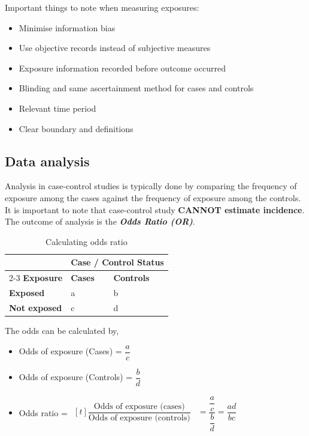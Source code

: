 \documentclass{article}
\begin{document}
Important things to note when measuring exposures:
\begin{itemize}
    \item Minimise information bias
    \item Use objective records instead of subjective measures
    \item Exposure information recorded before outcome occurred
    \item Blinding and same ascertainment method for cases and controls
    \item Relevant time period
    \item Clear boundary and definitions
\end{itemize}

\subsection*{Data analysis}
Analysis in case-control studies is typically done by comparing the frequency of exposure among the cases against the frequency of exposure among the controls. It is important to note that case-control study \textbf{CANNOT estimate incidence}. The outcome of analysis is the \textbf{\textit{Odds Ratio (OR)}}.
\begin{table}[H]
\centering
\begin{tabularx}{\textwidth}{|X|X|X|}
\hline
& \multicolumn{2}{c|}{\textbf{Case / Control Status}}  \\ \cline{2-3}
\textbf{Exposure} & \textbf{Cases} & \textbf{Controls} \\ \hline
\textbf{Exposed} & a & b  \\
\textbf{Not exposed} & c & d \\ \hline
\end{tabularx}
\caption{Calculating odds ratio}
\label{tab:odds-ratio-table}
\end{table}

The odds can be calculated by,
\begin{itemize}
    \item Odds of exposure (Cases) = $\dfrac{a}{c}$
    \item Odds of exposure (Controls) = $\dfrac{b}{d}$
    \item Odds ratio = 
        $\!\begin{aligned}[t]
            \dfrac{\text{Odds of exposure (cases)}}{\text{Odds of exposure (controls)}}
            &= \dfrac{\dfrac{a}{c}}{\dfrac{b}{d}} = \dfrac{ad}{bc}
        \end{aligned}$
\end{itemize}
\end{document}

